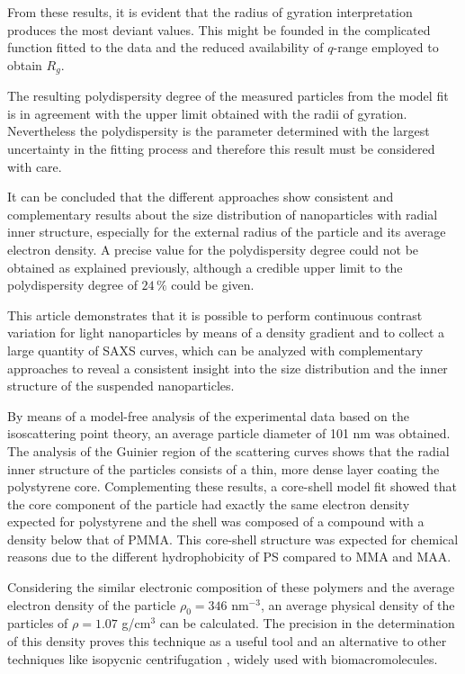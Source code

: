 From these results, it is evident that the radius of gyration interpretation produces the most deviant values. This might be founded in the complicated function fitted to the data and the reduced availability of $q$-range employed to obtain \( R_g \).

The resulting polydispersity degree of the measured particles from the model fit is in agreement with the upper limit obtained with the radii of gyration. Nevertheless the polydispersity is the parameter determined with the largest uncertainty in the fitting process and therefore this result must be considered with care.

It can be concluded that the different approaches show consistent and complementary results about the size distribution of nanoparticles with radial inner structure, especially for the external radius of the particle and its average electron density. A precise value for the polydispersity degree could not be obtained as explained previously, although a credible upper limit to the polydispersity degree of $24\,\%$ could be given.

This article demonstrates that it is possible to perform continuous contrast variation for light nanoparticles by means of a density gradient and to collect a large quantity of SAXS curves, which can be analyzed with complementary approaches to reveal a consistent insight into the size distribution and the inner structure of the suspended nanoparticles. 

By means of a model-free analysis of the experimental data based on the isoscattering point theory, an average particle diameter of 101 nm was obtained. The analysis of the Guinier region of the scattering curves shows that the radial inner structure of the particles consists of a thin, more dense layer coating the polystyrene core. Complementing these results, a core-shell model fit showed that the core component of the particle had exactly the same electron density expected for polystyrene and the shell was composed of a compound with a density below that of PMMA. This core-shell structure was expected for chemical reasons due to the different hydrophobicity of PS compared to MMA and MAA.

Considering the similar electronic composition of these polymers and the average electron density of the particle $\rho_0=346$ nm\(^{-3}\), an average physical density of the particles of $\rho=1.07$ g/cm\(^{3}\) can be calculated. The precision in the determination of this density proves this technique as a useful tool and an alternative to other techniques like isopycnic centrifugation \cite{vauthier_measurement_1999,arnold_sorting_2006,sun_separation_2009}, widely used with biomacromolecules.

